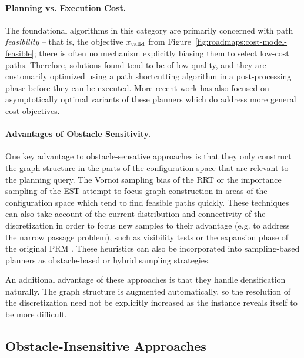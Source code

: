 \paragraph{Planning vs. Execution Cost.}
The foundational algorithms in this category are primarily concerned
with path \emph{feasibility} -- that is, the objective $x_{\mbox{\scriptsize valid}}$
from Figure~\ref{fig:roadmaps:cost-model-feasible};
there is often no mechanism explicitly biasing them to select
low-cost paths.
Therefore, solutions found tend to be of low quality,
and they are customarily optimized using a path shortcutting
algorithm in a post-processing phase before they can be executed.
More recent work has also focused on asymptotically optimal variants
of these planners
\citep{karaman2010rrtstar, karaman2011samplingoptimal, gammell2015bitstar, hauser2015lazy}
which do address more general cost objectives.

\paragraph{Advantages of Obstacle Sensitivity.}
One key advantage to obstacle-sensative approaches is that
they only construct the graph structure in the parts of the
configuration space that are relevant to the planning query.
The Vornoi sampling bias of the RRT or the importance sampling of the EST
attempt to focus graph construction in areas of the configuration space
which tend to find feasible paths quickly.
These techniques can also take account of the current distribution
and connectivity of the discretization in order to focus new
samples to their advantage
(e.g. to address the narrow passage problem),
such as visibility tests \citep{simeon2000visibilityprms}
or the expansion phase of the original PRM
\citep{kavrakietal1996prm}.
These heuristics can also be incorporated into sampling-based planners
as obstacle-based \citep{boor1999prmgaussiansampling}
or hybrid \citep{hsu2005hybridsampling} sampling strategies.

An additional advantage of these approaches
is that they handle densification naturally.
The graph structure is augmented automatically,
so the resolution of the discretization need not be explicitly
increased as the instance reveals itself to be more difficult.


\subsection{Obstacle-Insensitive Approaches}

